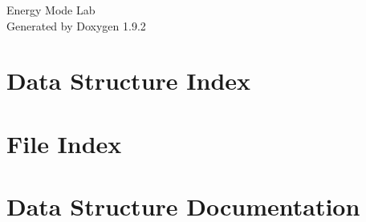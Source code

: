 \documentclass[twoside]{book}
\newcommand{\+}{\discretionary{\mbox{\scriptsize$\hookleftarrow$}}{}{}}
\newcommand{\clearemptydoublepage}{%
    \newpage{\pagestyle{empty}\cleardoublepage}%
  }
\begin{document}
  \raggedbottom
    \hypersetup{pageanchor=false,
                bookmarksnumbered=true,
                pdfencoding=unicode
               }
  \begin{titlepage}
  \vspace*{7cm}
  \begin{center}%
  {\Large Energy Mode Lab}\\
  \vspace*{1cm}
  {\large Generated by Doxygen 1.9.2}\\
  \end{center}
  \end{titlepage}
  \clearemptydoublepage
  \tableofcontents
  \clearemptydoublepage
  \hypersetup{pageanchor=true}
\chapter{Data Structure Index}

\chapter{File Index}

\chapter{Data Structure Documentation}

\end{document}
